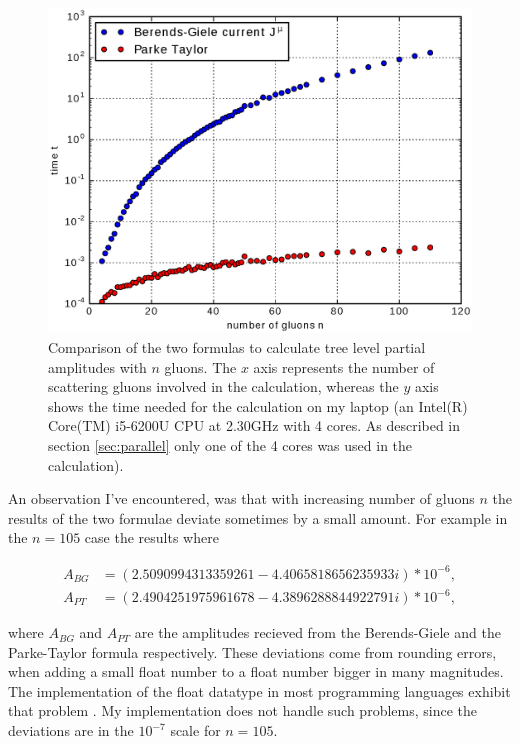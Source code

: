 \documentclass{article}
\theoremstyle{definition}
\numberwithin{equation}{section}
\begin{document}
\begin{figure}[h]
    \begin{center}
        \includegraphics[scale=0.7,natwidth=1079,natheight=359]{comparison.eps}
        \caption{Comparison of the two formulas to calculate tree level partial amplitudes with $n$ gluons. The $x$ axis represents the number of scattering gluons involved in the calculation, whereas the $y$ axis shows the time needed for the calculation on my laptop (an Intel(R) Core(TM) i5-6200U CPU at 2.30GHz with 4 cores. As described in section \ref{sec:parallel} only one of the 4 cores was used in the calculation).}
        \label{fig:compare}
    \end{center}
\end{figure}

An observation I've encountered, was that with increasing number of gluons $n$ the results of the two formulae deviate sometimes by a small amount. For example in the $n=105$ case the results where

\begin{align*}
    A_{BG} &= ( 2.5090994313359261 - 4.4065818656235933 i ) *10^{-6}, \\
    A_{PT} &= ( 2.4904251975961678 - 4.3896288844922791 i ) *10^{-6},
\end{align*}

where $A_{BG}$ and $A_{PT}$ are the amplitudes recieved from the Berends-Giele and the Parke-Taylor formula respectively. These deviations come from rounding errors, when adding a small float number to a float number bigger in many magnitudes. The implementation of the float datatype in most programming languages exhibit that problem \cite{goldberg1991}. My implementation does not handle such problems, since the deviations are in the $10^{-7}$ scale for $n=105$.
\end{document}
